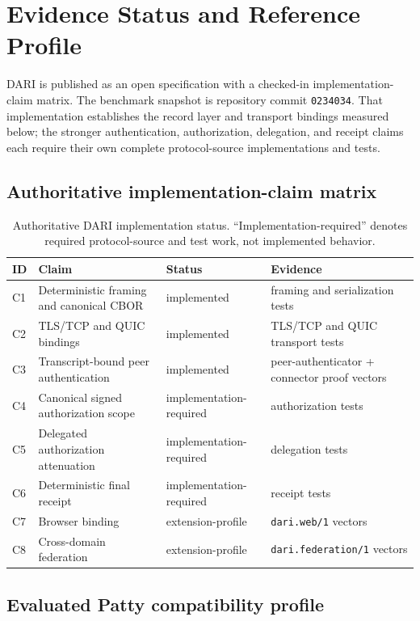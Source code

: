 \documentclass[10pt]{article}
\begin{document}
\section{Evidence Status and Reference Profile}
\label{sec:implementation}

DARI is published as an open specification with a checked-in implementation-claim matrix. The benchmark snapshot is repository commit \texttt{0234034}. That implementation establishes the record layer and transport bindings measured below; the stronger authentication, authorization, delegation, and receipt claims each require their own complete protocol-source implementations and tests.

\subsection{Authoritative implementation-claim matrix}

\begin{table}[t]
\centering
\caption{Authoritative DARI implementation status. ``Implementation-required'' denotes required protocol-source and test work, not implemented behavior.}
\label{tab:claims}
\scriptsize
\begin{tabularx}{\textwidth}{@{}l Y l Y@{}}
\toprule
ID & Claim & Status & Evidence \\
\midrule
C1 & Deterministic framing and canonical CBOR & implemented & framing and serialization tests \\
C2 & TLS/TCP and QUIC bindings & implemented & TLS/TCP and QUIC transport tests \\
C3 & Transcript-bound peer authentication & implemented & peer-authenticator + connector proof vectors \\
C4 & Canonical signed authorization scope & implementation-required & authorization tests \\
C5 & Delegated authorization attenuation & implementation-required & delegation tests \\
C6 & Deterministic final receipt & implementation-required & receipt tests \\
C7 & Browser binding & extension-profile & \texttt{dari.web/1} vectors \\
C8 & Cross-domain federation & extension-profile & \texttt{dari.federation/1} vectors \\
\bottomrule
\end{tabularx}
\end{table}

\subsection{Evaluated Patty compatibility profile}
\end{document}
